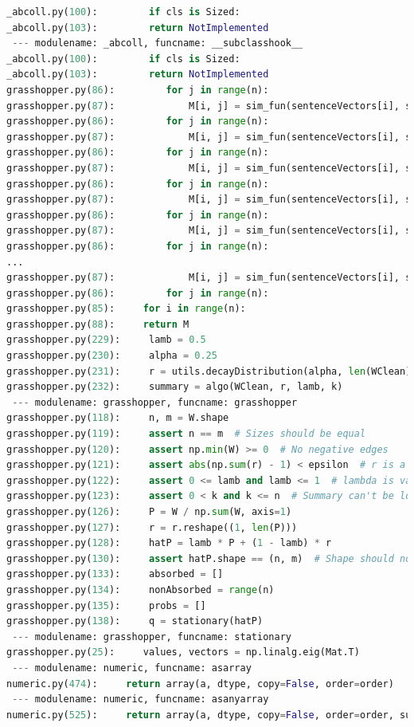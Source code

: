 \documentclass[10pt]{article}
\begin{document}
\begin{lstlisting}[breaklines,language=Python]
_abcoll.py(100):         if cls is Sized:
_abcoll.py(103):         return NotImplemented
 --- modulename: _abcoll, funcname: __subclasshook__
_abcoll.py(100):         if cls is Sized:
_abcoll.py(103):         return NotImplemented
grasshopper.py(86):         for j in range(n):
grasshopper.py(87):             M[i, j] = sim_fun(sentenceVectors[i], sentenceVectors[j])
grasshopper.py(86):         for j in range(n):
grasshopper.py(87):             M[i, j] = sim_fun(sentenceVectors[i], sentenceVectors[j])
grasshopper.py(86):         for j in range(n):
grasshopper.py(87):             M[i, j] = sim_fun(sentenceVectors[i], sentenceVectors[j])
grasshopper.py(86):         for j in range(n):
grasshopper.py(87):             M[i, j] = sim_fun(sentenceVectors[i], sentenceVectors[j])
grasshopper.py(86):         for j in range(n):
grasshopper.py(87):             M[i, j] = sim_fun(sentenceVectors[i], sentenceVectors[j])
grasshopper.py(86):         for j in range(n):
...
grasshopper.py(87):             M[i, j] = sim_fun(sentenceVectors[i], sentenceVectors[j])
grasshopper.py(86):         for j in range(n):
grasshopper.py(85):     for i in range(n):
grasshopper.py(88):     return M
grasshopper.py(229):     lamb = 0.5
grasshopper.py(230):     alpha = 0.25
grasshopper.py(231):     r = utils.decayDistribution(alpha, len(WClean))
grasshopper.py(232):     summary = algo(WClean, r, lamb, k)
 --- modulename: grasshopper, funcname: grasshopper
grasshopper.py(118):     n, m = W.shape
grasshopper.py(119):     assert n == m  # Sizes should be equal
grasshopper.py(120):     assert np.min(W) >= 0  # No negative edges
grasshopper.py(121):     assert abs(np.sum(r) - 1) < epsilon  # r is a distribution
grasshopper.py(122):     assert 0 <= lamb and lamb <= 1  # lambda is valid
grasshopper.py(123):     assert 0 < k and k <= n  # Summary can't be longer than document!
grasshopper.py(126):     P = W / np.sum(W, axis=1)
grasshopper.py(127):     r = r.reshape((1, len(P)))
grasshopper.py(128):     hatP = lamb * P + (1 - lamb) * r
grasshopper.py(130):     assert hatP.shape == (n, m)  # Shape should not change!
grasshopper.py(133):     absorbed = []
grasshopper.py(134):     nonAbsorbed = range(n)
grasshopper.py(135):     probs = []
grasshopper.py(138):     q = stationary(hatP)
 --- modulename: grasshopper, funcname: stationary
grasshopper.py(25):     values, vectors = np.linalg.eig(Mat.T)
 --- modulename: numeric, funcname: asarray
numeric.py(474):     return array(a, dtype, copy=False, order=order)
 --- modulename: numeric, funcname: asanyarray
numeric.py(525):     return array(a, dtype, copy=False, order=order, subok=True)

\end{lstlisting}
\end{document}
